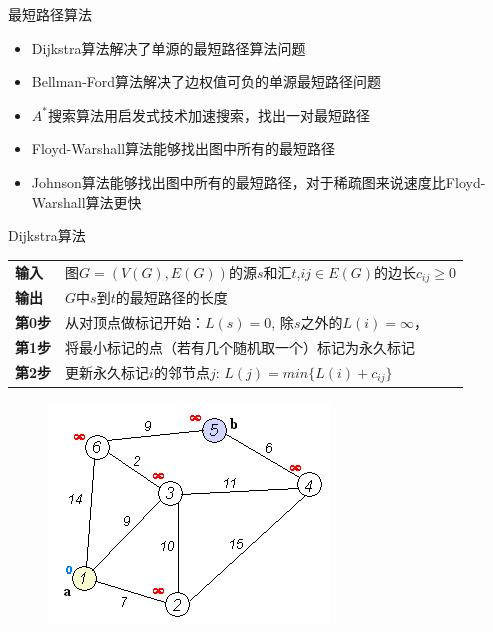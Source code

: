 \documentclass[UTF8]{ctexbeamer}
\begin{document}
\begin{frame}{最短路径算法}
  \begin{itemize}
  \item Dijkstra算法解决了单源的最短路径算法问题
  \item Bellman-Ford算法解决了边权值可负的单源最短路径问题
  \item $A^*$搜索算法用启发式技术加速搜索，找出一对最短路径
  \item Floyd-Warshall算法能够找出图中所有的最短路径
  \item Johnson算法能够找出图中所有的最短路径，对于稀疏图来说速度比Floyd-Warshall算法更快
  \end{itemize}

\end{frame}

\begin{frame}{Dijkstra算法}
  \begin{table}
    \centering
    \begin{tabular}{l|l}
      \rowcolor{lightgray}\textbf{输入} & 图$G=(V(G), E(G))$的源$s$和汇$t$,$ij \in E(G)$的边长$c_{ij} \ge 0$\\
      \textbf{输出} & $G$中$s$到$t$的最短路径的长度\\
      \rowcolor{lightgray}\textbf{第0步} & 从对顶点做标记开始：$L(s) = 0$, 除$s$之外的$L(i)=\infty$，\\
      \textbf{第1步} & 将最小标记的点（若有几个随机取一个）标记为永久标记\\
      \rowcolor{lightgray}\textbf{第2步} & 更新永久标记$i$的邻节点$j$: $L(j) = min\{L(i) + c_{ij}\}$\\
    \end{tabular}
  \end{table}
  \begin{figure}
    \centering
    \includegraphics[width=.3\textwidth]{Dijksta_Anim.png}
  \end{figure}
\end{frame}
\end{document}

